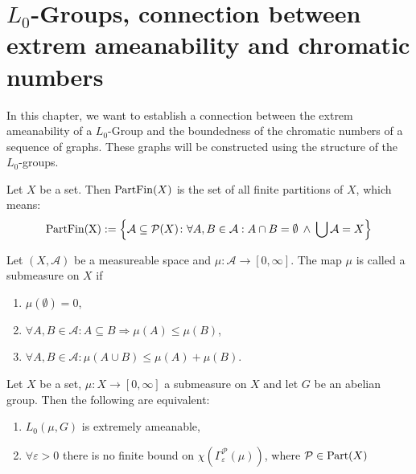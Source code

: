 \section{$L_0$-Groups, connection between extrem ameanability and chromatic numbers}

In this chapter, we want to establish a connection between the extrem ameanability of a $L_0$-Group and the boundedness of the chromatic numbers of a sequence of graphs.
These graphs will be constructed using the structure of the $L_0$-groups.

\begin{defin}
  Let $X$ be a set. Then ${\rm PartFin}(X)$ is the set of all finite partitions of $X$, which means:
  \begin{equation*}
    {\rm PartFin(X)} := \left\{ \mathcal{A} \subseteq \P(X)\colon \forall A,B \in \mathcal{A}: A \cap B = \emptyset \: \land \: \bigcup\mathcal{A} = X \right\}
  \end{equation*}
\end{defin}

\begin{defin}
  Let $(X, \mathcal{A})$ be a measureable space and $\mu\colon \mathcal{A} \to [0, \infty]$. The map $\mu$ is called a submeasure on $X$ if
  \begin{enumerate}
    \item $\mu(\emptyset) = 0$,
    \item $\forall A, B \in \mathcal{A}\colon A \subseteq B \Rightarrow \mu(A) \leq \mu(B)$,
    \item $\forall A, B \in \mathcal{A}\colon \mu(A \cup B) \leq \mu(A) + \mu(B)$.
  \end{enumerate}
\end{defin}

\begin{lemma}
  Let $X$ be a set, $\mu\colon X \to [0, \infty]$ a submeasure on $X$ and let $G$ be an abelian group. Then the following are equivalent:
  \begin{enumerate}
    \item $L_0(\mu, G)$ is extremely ameanable,
    \item $\forall \varepsilon > 0$ there is no finite bound on $\chi(\Gamma_{\varepsilon}^{\mathcal{P}}(\mu))$, where $\mathcal{P} \in {\rm Part}(X)$
  \end{enumerate}
\end{lemma}
